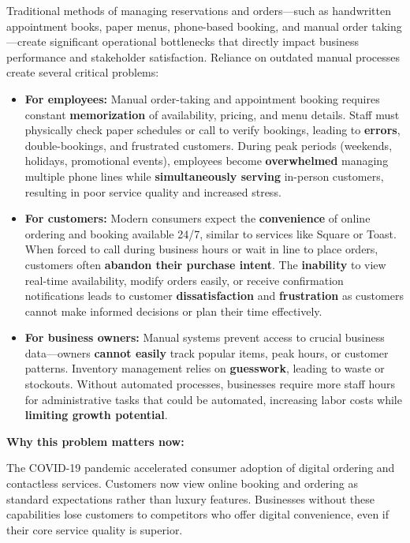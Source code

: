 \documentclass[]{VUMIFTemplateClass}
\begin{document}
Traditional methods of managing reservations and orders—such as handwritten
appointment books, paper menus, phone-based booking, and manual order
taking—create significant operational bottlenecks that directly impact business
performance and stakeholder satisfaction. Reliance on outdated manual processes
create several critical problems:

\begin{itemize}
    \item \textbf{For employees:} Manual order-taking and appointment booking
    requires constant \textbf{memorization} of availability, pricing, and menu details.
    Staff must physically check paper schedules or call to verify bookings,
    leading to \textbf{errors}, double-bookings, and frustrated customers. During peak
    periods (weekends, holidays, promotional events), employees become
    \textbf{overwhelmed} managing multiple phone lines while \textbf{simultaneously serving}
    in-person customers, resulting in poor service quality and increased stress.

    \item \textbf{For customers:} Modern consumers expect the
    \textbf{convenience} of online ordering and booking available 24/7, similar
    to services like Square or Toast. When forced to call during business hours
    or wait in line to place orders, customers often \textbf{abandon their
    purchase intent}. The \textbf{inability} to view real-time availability,
    modify orders easily, or receive confirmation notifications leads to
    customer \textbf{dissatisfaction} and \textbf{frustration} as customers
    cannot make informed decisions or plan their time effectively.

    \item \textbf{For business owners:} Manual systems prevent access to crucial
    business data—owners \textbf{cannot easily} track popular items, peak hours, or
    customer patterns. Inventory management relies on \textbf{guesswork}, leading to
    waste or stockouts. Without automated processes, businesses require more
    staff hours for administrative tasks that could be automated, increasing
    labor costs while \textbf{limiting growth potential}.
\end{itemize}

\textbf{Why this problem matters now:}

The COVID-19 pandemic accelerated consumer adoption of digital ordering and
contactless services. Customers now view online booking and ordering as standard
expectations rather than luxury features. Businesses without these capabilities
lose customers to competitors who offer digital convenience, even if their core
service quality is superior.
\end{document}
